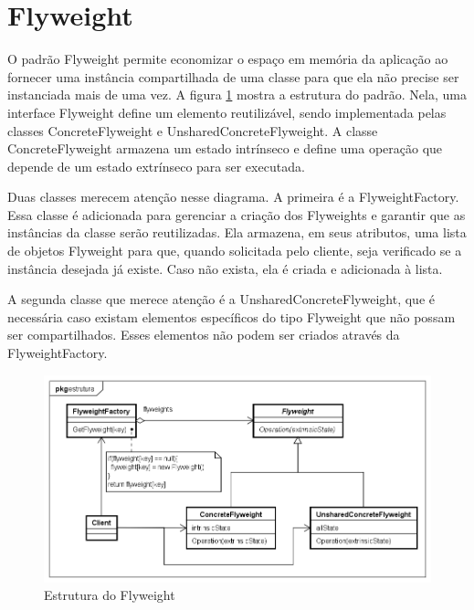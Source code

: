 \section{Flyweight}

O padrão Flyweight permite economizar o espaço em memória 
da aplicação ao fornecer uma instância compartilhada de 
uma classe para que ela não precise ser instanciada 
mais de uma vez. A figura \ref{flyweight_struct} mostra 
a estrutura do padrão. Nela, uma interface Flyweight 
define um elemento reutilizável, sendo implementada 
pelas classes ConcreteFlyweight e UnsharedConcreteFlyweight. 
A classe ConcreteFlyweight armazena um estado intrínseco 
e define uma operação que depende de um estado extrínseco 
para ser executada. \cite{gamma:1995}

Duas classes merecem atenção nesse diagrama. A primeira 
é a FlyweightFactory. Essa classe é adicionada para 
gerenciar a criação dos Flyweights e garantir que as 
instâncias da classe serão reutilizadas. Ela armazena, em 
seus atributos, uma lista de objetos Flyweight para que,  
quando solicitada pelo cliente, seja verificado se a instância 
desejada já existe. Caso não exista, ela é criada e 
adicionada à lista. 

A segunda classe que merece atenção é a UnsharedConcreteFlyweight, 
que é necessária caso existam elementos específicos 
do tipo Flyweight que não possam ser compartilhados. 
Esses elementos não podem ser criados através da 
FlyweightFactory.

\begin{figure}[htb]
	\caption{\label{flyweight_struct}Estrutura do Flyweight}
	\begin{center}
	    \includegraphics[scale=0.5]{5_padroes-contexto-funcional/5.2_estruturais/5.2.6_flyweight/flyweight_estrutura.png}
	\end{center}
\end{figure}

